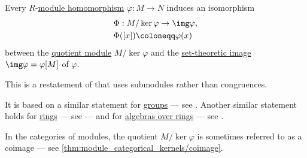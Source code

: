 \begin{theorem}\label{thm:homomorphism_theorem_for_modules}
  Every \( R \)-\hyperref[def:module/morphism]{module homomorphism} \( {\varphi: M \to N} \) induces an isomorphism
  \begin{equation*}
    \begin{aligned}
      &\Phi: M / \ker \varphi \to \img \varphi, \\
      &\Phi([x]) \coloneqq \varphi(x)
    \end{aligned}
  \end{equation*}
  between the \hyperref[def:module/quotient]{quotient module} \( M / \ker \varphi \) and the \hyperref[def:set_valued_function/image]{set-theoretic image} \( \img \varphi = \varphi[M] \) of \( \varphi \).
\end{theorem}
\begin{comments}
  \item This is a restatement of  that uses submodules rather than congruences.

  It is based on a similar statement for \hyperref[def:group]{groups} --- see . Another similar statement holds for \hyperref[def:ring]{rings} --- see  --- and for \hyperref[def:algebra_over_ring]{algebras over rings} --- see .

  \item In the categories of modules, the quotient \( M / \ker \varphi \) is sometimes referred to as a coimage --- see \cref{thm:module_categorical_kernels/coimage}.
\end{comments}
